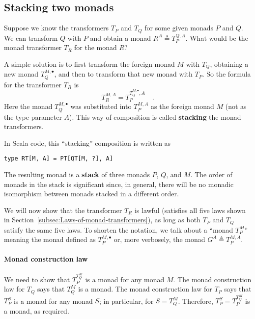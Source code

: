 \subsection{Stacking two monads\label{subsec:Stacking-two-monads}}

Suppose we know the transformers $T_{P}$ and $T_{Q}$ for some given
monads $P$ and $Q$. We can transform $Q$ with $P$ and obtain a
monad $R^{A}\triangleq T_{P}^{Q,A}$. What would be the monad transformer
$T_{R}$ for the monad $R$?

A simple solution is to first transform the foreign monad $M$ with
$T_{Q}$, obtaining a new monad $T_{Q}^{M,\bullet}$, and then to
transform that new monad with $T_{P}$. So the formula for the transformer
$T_{R}$ is
\[
T_{R}^{M,A}=T_{P}^{T_{Q}^{M,\bullet},A}\quad.
\]
Here the monad $T_{Q}^{M,\bullet}$ was substituted into $T_{P}^{M,A}$
as the foreign monad $M$ (not as the type parameter $A$). This way
of composition is called \textbf{stacking}
the monad transformers. 

In Scala code, this ``stacking'' composition is written as
\begin{lstlisting}
type RT[M, A] = PT[QT[M, ?], A]
\end{lstlisting}
The resulting monad is a \textbf{stack} of
three monads $P$, $Q$, and $M$. The order of monads in the stack
is significant since, in general, there will be no monadic isomorphism
between monads stacked in a different order.

We will now show that the transformer $T_{R}$ is lawful (satisfies
all five laws shown in Section~\ref{subsec:Laws-of-monad-transformers}),
as long as both $T_{P}$ and $T_{Q}$ satisfy the same five laws.
To shorten the notation, we talk about a ``monad $T_{P}^{M}$''
meaning the monad defined as $T_{P}^{M,\bullet}$ or, more verbosely,
the monad $G^{A}\triangleq T_{P}^{M,A}$.

\paragraph{Monad construction law}

We need to show that $T_{P}^{T_{Q}^{M}}$ is a monad for any monad
$M$. The monad construction law for $T_{Q}$ says that $T_{Q}^{M}$
is a monad. The monad construction law for $T_{P}$ says that $T_{P}^{S}$
is a monad for any monad $S$; in particular, for $S=T_{Q}^{M}$.
Therefore, $T_{P}^{S}=T_{P}^{T_{Q}^{M}}$ is a monad, as required.

